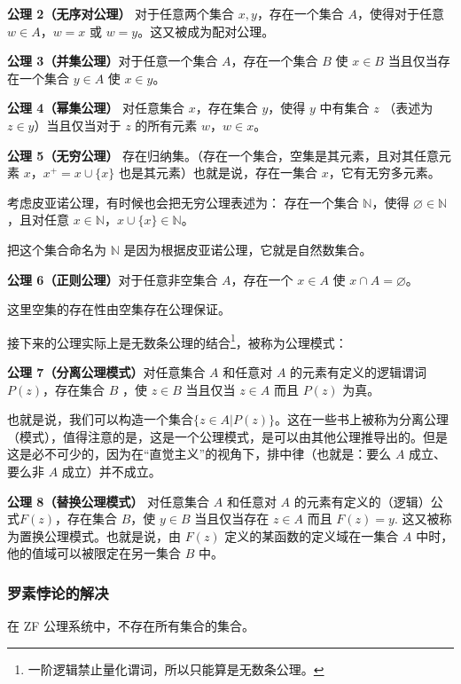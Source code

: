 \textbf{公理 2（无序对公理）} 对于任意两个集合 $x,y$，存在一个集合 $A$，使得对于任意 $w\in A$，$w=x$ 或 $w=y$。这又被成为配对公理。

\textbf{公理 3（并集公理）}对于任意一个集合 $A$，存在一个集合 $B$ 使 $x\in B$ 当且仅当存在一个集合 $y\in A$ 使 $x\in y$。

\textbf{公理 4（幂集公理）} 对任意集合 $x$，存在集合 $y$，使得 $y$ 中有集合 $z$ （表述为 $z \in y$）当且仅当对于 $z$ 的所有元素 $w$，$w\in x$。

\textbf{公理 5（无穷公理）} 存在归纳集。（存在一个集合，空集是其元素，且对其任意元素 $x$，$x^+ = x\cup \{x\}$ 也是其元素）也就是说，存在一集合 $x$，它有无穷多元素。

考虑皮亚诺公理，有时候也会把无穷公理表述为：
存在一个集合 $\mathbb{N}$，使得 $\varnothing\in\mathbb{N}$，且对任意 $x\in \mathbb{N}$，$x\cup\{x\}\in\mathbb{N}$。

把这个集合命名为 $\mathbb{N}$ 是因为根据皮亚诺公理，它就是自然数集合。

\textbf{公理 6（正则公理）}对于任意非空集合 $A$，存在一个 $x\in A$ 使 $x\cap A=\varnothing$。

这里空集的存在性由空集存在公理保证。

接下来的公理实际上是无数条公理的结合\footnote{一阶逻辑禁止量化谓词，所以只能算是无数条公理。}，被称为公理模式：

\textbf{公理 7（分离公理模式）}对任意集合 $A$ 和任意对 $A$ 的元素有定义的逻辑谓词 $P(z)$，存在集合 $B$ ，使 $z\in B$ 当且仅当 $z\in A$ 而且 $P(z)$ 为真。

也就是说，我们可以构造一个集合$\{z\in A | P(z)\}$。这在一些书上被称为分离公理（模式），值得注意的是，这是一个公理模式，是可以由其他公理推导出的。但是这是必不可少的，因为在“直觉主义”的视角下，排中律（也就是：要么 $A$ 成立、要么非 $A$ 成立）并不成立。



\textbf{公理 8（替换公理模式）} 对任意集合 $A$ 和任意对 $A$ 的元素有定义的（逻辑）公式$F(z)$，存在集合 $B$，使 $y\in B$ 当且仅当存在 $z\in A$ 而且 $F(z)=y$. 这又被称为置换公理模式。也就是说，由 $F(z)$ 定义的某函数的定义域在一集合 $A$ 中时，他的值域可以被限定在另一集合 $B$ 中。

\subsubsection{罗素悖论的解决}
\begin{theorem}{}
在 ZF 公\label{the_SetAxi_1}理系统中，不存在所有集合的集合。
\end{theorem}

